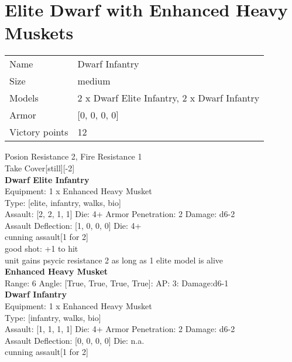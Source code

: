\pagebreak\pagebreak

\section{ Elite Dwarf with Enhanced Heavy Muskets }

\begin{tabular}{ll}
  Name & Dwarf Infantry \\
  Size & medium\\
  Models & 2 x Dwarf Elite Infantry, 2 x Dwarf Infantry\\
  Armor & [0, 0, 0, 0]\\
  Victory points & 12\\
\end{tabular}

Posion Resistance 2, Fire Resistance 1\\ 
Take Cover[still][-2]\\ 


{\bf Dwarf Elite Infantry } \\
Equipment: 1 x Enhanced Heavy Musket \\
Type: [elite, infantry, walks, bio] \\

Assault: [2, 2, 1, 1] Die: 4+ Armor Penetration: 2 Damage: d6-2 \\
Assault Deflection: [1, 0, 0, 0] Die: 4+\\
\indent cunning assault[1 for 2]\\ 
 

good shot: +1 to hit\\ 
unit gains psycic resistance 2 as long as 1 elite model is alive\\ 


{\bf Enhanced Heavy Musket } \\



Range: 6  Angle: [True, True, True, True]: AP: 3: Damage:d6-1 \\




 



{\bf Dwarf Infantry } \\
Equipment: 1 x Enhanced Heavy Musket \\
Type: [infantry, walks, bio] \\

Assault: [1, 1, 1, 1] Die: 4+ Armor Penetration: 2 Damage: d6-2 \\
Assault Deflection: [0, 0, 0, 0] Die: n.a.\\
\indent cunning assault[1 for 2]\\ 
 



